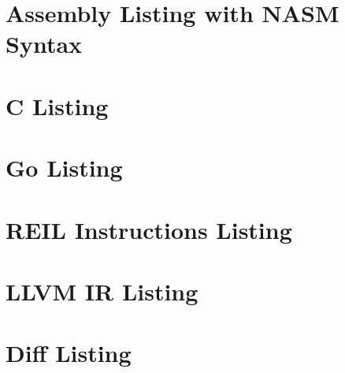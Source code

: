 \documentclass[12pt, a4paper]{article}
\begin{document}
\section{Assembly Listing with NASM Syntax}



\cleardoublepage

\section{C Listing}



\cleardoublepage

\section{Go Listing}



\cleardoublepage

\section{REIL Instructions Listing}



\cleardoublepage

\section{LLVM IR Listing}



\cleardoublepage

\section{Diff Listing}


\end{document}
